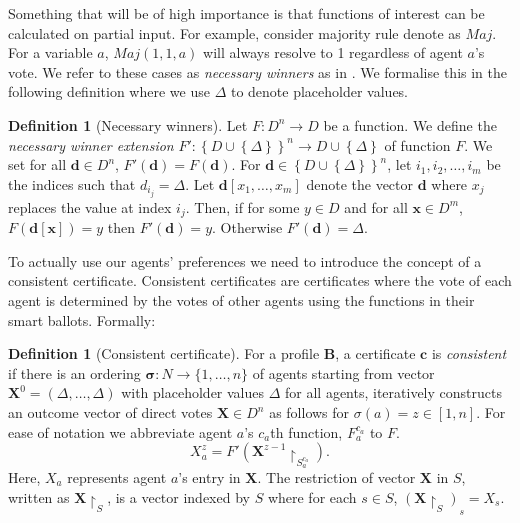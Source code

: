 \documentclass[11pt,a4paper, titlepage]{article}
\theoremstyle{definition}
\newtheorem{definition}[theorem]{Definition}
\let\vec\mathbf
\begin{document}
Something that will be of high importance is that functions of interest can be calculated on partial input.  
For example, consider majority rule denote as $\mathit{Maj}$. For a variable $a$, $\mathit{Maj}(1, 1, a)$ will always resolve to 1 regardless of agent $a$'s vote. 
We refer to these cases as \emph{necessary winners} as in \citet{konczak2005voting}.
We formalise this in the following definition where we use $\Delta$ to denote placeholder values.

\begin{definition}[Necessary winners]
    Let $F \colon D^n \longrightarrow D $ be a function.
    We define the \emph{necessary winner extension} $F' \colon \left\{D \cup \left\{\Delta\right\}\right\}^n \longrightarrow D \cup \left\{\Delta\right\}$ of function $F$. 
    We set for all $\vec{d} \in D^n$, $F'(\vec{d}) = F(\vec{d})$.
    For $\vec{d} \in \left\{D \cup \left\{\Delta\right\}\right\}^n$, let $i_1, i_2, \ldots, i_m$ be the indices such that $d_{i_j} = \Delta$.
    Let $\vec{d}[x_1, \ldots, x_m]$ denote the vector $\vec{d}$ where $x_j$ replaces the value at index $i_j$. Then, if for some $y \in D$ and for all $\vec{x} \in D^m$, $F(\vec{d}[\vec{x}]) = y$ then $F'(\vec{d}) = y$.
    Otherwise $F'(\vec{d}) = \Delta$.
\end{definition}

To actually use our agents' preferences we need to introduce the concept of a consistent certificate. 
Consistent certificates are certificates where the vote of each agent is determined by the votes of other agents using the functions in their smart ballots. Formally:

\begin{definition}[Consistent certificate]
    For a profile $\mathbf{B}$, a certificate $\mathbf{c}$ is \emph{consistent} if there is an ordering $\mathbf{\sigma} \colon N \longrightarrow \{1,\ldots, n\}$ of agents starting from vector $\vec{X}^0 = (\Delta, \ldots, \Delta)$ with placeholder values $\Delta$ for all agents, iteratively constructs an outcome vector of direct votes $\vec{X} \in D^n$ as follows for $\sigma(a) = z \in [1,n]$. For ease of notation we abbreviate agent $a$'s $c_a$th function, $F_a^{c_a}$ to $F$.
    \[
        X^z_a = F'(\vec{X}^{z-1} \restriction_{S^{c_a}_a} ).
    \]
    Here, $X_a$ represents agent $a$'s entry in $\vec{X}$. 
    The restriction of vector $\vec{X}$ in $S$, written as $\vec{X} \restriction_S$, is a vector indexed by $S$ where for each $s \in S$,  $(\vec{X} \restriction_S)_s = X_s$.


\end{definition}
\end{document}
